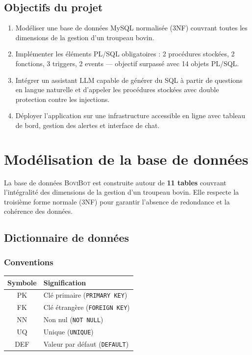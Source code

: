 \documentclass[12pt, a4paper, oneside]{report}
\newcommand{\bovibot}{\textsc{BoviBot}}
\begin{document}
\section{Objectifs du projet}

\begin{enumerate}[itemsep=4pt]
  \item Modéliser une base de données MySQL normalisée (3NF) couvrant toutes les
    dimensions de la gestion d'un troupeau bovin.
  \item Implémenter les éléments PL/SQL obligatoires : 2 procédures stockées,
    2 fonctions, 3 triggers, 2 events — objectif surpassé avec 14 objets PL/SQL.
  \item Intégrer un assistant LLM capable de générer du SQL à partir de questions en
    langue naturelle et d'appeler les procédures stockées avec double protection
    contre les injections.
  \item Déployer l'application sur une infrastructure accessible en ligne avec tableau
    de bord, gestion des alertes et interface de chat.
\end{enumerate}

\chapter{Modélisation de la base de données}

La base de données \bovibot{} est construite autour de \textbf{11 tables} couvrant
l'intégralité des dimensions de la gestion d'un troupeau bovin. Elle respecte la
troisième forme normale (3NF) pour garantir l'absence de redondance et la cohérence
des données.

\section{Dictionnaire de données}

\subsection*{Conventions}

\begin{center}
  \begin{tabular}{@{}cl@{}}
    \toprule
    \textbf{Symbole} & \textbf{Signification} \\
    \midrule
    PK  & Clé primaire (\texttt{PRIMARY KEY}) \\
    FK  & Clé étrangère (\texttt{FOREIGN KEY}) \\
    NN  & Non nul (\texttt{NOT NULL}) \\
    UQ  & Unique (\texttt{UNIQUE}) \\
    DEF & Valeur par défaut (\texttt{DEFAULT}) \\
    \bottomrule
  \end{tabular}
\end{center}
\end{document}

